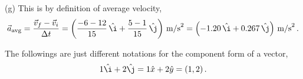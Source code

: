 \documentclass[11pt, onesided]{book}
\theoremstyle{break}
\theoremstyle{break}
\begin{document}
(g) This is by definition of average velocity,
\begin{align*}
\vec{a}_{\text{avg}} = \frac{\vec{v}_f - \vec{v}_i}{\Delta t} = \left(
\frac{-6-12}{15}\,\hat{\i} + \frac{5-1}{15}\,\hat{\j}
\right)\,\text{m/s}^2 = \left(-1.20 \,\hat{\i} + 0.267\,\hat{\j}\right)\,\text{m/s}^2\,.
\end{align*}

The followings are just different notations for the component form of a vector, 
\begin{align*}
1\hat{\i}+2\hat{\j} = 1\hat{x} + 2\hat{y} = (1,2)\,.
\end{align*}
\end{document}
